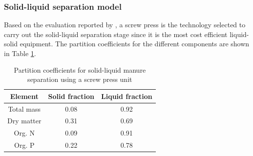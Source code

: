 \documentclass[10pt,a4paper]{article}
\begin{document}
\subsubsection{Solid-liquid separation model}
Based on the evaluation reported by , a screw press is the technology selected to carry out the solid-liquid separation stage since it is the most cost efficient liquid-solid equipment. The partition coefficients for the different components are shown in Table \ref{table:part_coef}.
\begin{table}[H] 
	\begin{adjustwidth}{}{}
		\centering
		\caption{Partition coefficients for solid-liquid manure separation using a screw press unit \protect{}} \label{table:part_coef}
		\begin{tabular}{c c c}
			\toprule
			Element 	& Solid fraction & Liquid fraction	\\ \midrule
			Total mass 	& 0.08		& 0.92 \\
			Dry matter 	& 0.31		& 0.69 \\
			Org. N 		& 0.09		& 0.91 \\
			Org. P		& 0.22	 	& 0.78 \\ \bottomrule
		\end{tabular}
	\end{adjustwidth}
\end{table}
\end{document}
